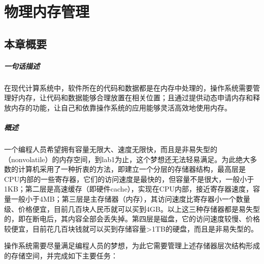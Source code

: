 \chapter{物理内存管理}\label{ch_memory}

\section{本章概要}

\paragraph{一句话描述}
在现代计算系统中，软件所在的代码和数据都是在内存中处理的，操作系统需要管理好内存，让代码和数据能够合理放置在相关位置；且通过提供动态申请内存和释放内存的功能，让自己和依靠操作系统的应用能够灵活高效地使用内存。


\paragraph{概述}

一个编程人员希望拥有容量无限大、速度无限快，而且是非易失型的（nonvolatile）的内存空间，到lab1为止，这个梦想还无法轻易满足。为此绝大多数的计算机采用了一种折衷的方法，即建立一个分层的存储器结构，最高层是CPU内部的一些寄存器，它们的访问速度是最快的，但容量不是很大，一般小于1KB；第二层是高速缓存（即硬件cache），实现在CPU内部，接近寄存器速度，容量一般小于4MB；第三层是主存储器（内存），其访问速度比寄存器小一个数量级、价格便宜，目前几百块人民币就可以买到4GB。以上这三种存储器都是易失型的，即在断电后，其内容全部会丢失掉。第四层是磁盘，它的访问速度较慢、价格较便宜，目前花几百块钱就可以买到存储容量\textgreater{}1TB的硬盘，而且是非易失型的。

操作系统需要尽量满足编程人员的梦想，为此它需要管理上述存储器层次结构形成的存储空间，并完成如下主要任务：

